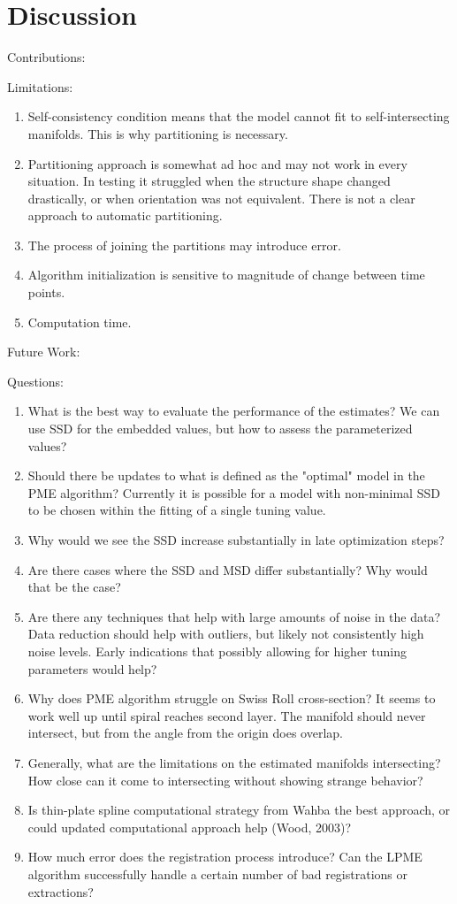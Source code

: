 \documentclass[11pt,reqno]{article}
\begin{document}
\section{Discussion}

Contributions:

Limitations:
\begin{enumerate}
  \item Self-consistency condition means that the model cannot fit to self-intersecting manifolds. This is why partitioning is necessary.
  \item Partitioning approach is somewhat ad hoc and may not work in every situation. In testing it struggled when the structure shape changed drastically, or when orientation was not equivalent. There is not a clear approach to automatic partitioning.
  \item The process of joining the partitions may introduce error.
  \item Algorithm initialization is sensitive to magnitude of change between time points.
  \item Computation time.
\end{enumerate}

Future Work:

Questions:
\begin{enumerate}
  \item What is the best way to evaluate the performance of the estimates? We can use SSD for the embedded values, but how to assess the parameterized values?
  \item Should there be updates to what is defined as the "optimal" model in the PME algorithm? Currently it is possible for a model with non-minimal SSD to be chosen within the fitting of a single tuning value.
  \item Why would we see the SSD increase substantially in late optimization steps?
  \item Are there cases where the SSD and MSD differ substantially? Why would that be the case?
  \item Are there any techniques that help with large amounts of noise in the data? Data reduction should help with outliers, but likely not consistently high noise levels. Early indications that possibly allowing for higher tuning parameters would help?
  \item Why does PME algorithm struggle on Swiss Roll cross-section? It seems to work well up until spiral reaches second layer. The manifold should never intersect, but from the angle from the origin does overlap.
  \item Generally, what are the limitations on the estimated manifolds intersecting? How close can it come to intersecting without showing strange behavior?
  \item Is thin-plate spline computational strategy from Wahba the best approach, or could updated computational approach help (Wood, 2003)?
  \item How much error does the registration process introduce? Can the LPME algorithm successfully handle a certain number of bad registrations or extractions?
\end{enumerate}

\nocite{*}

%
\printbibliography
\end{document}
